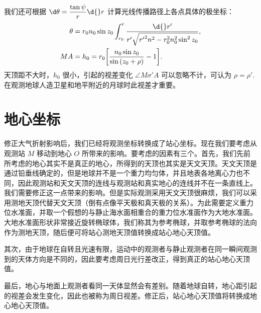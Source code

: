\documentclass[UTF8, 12pt, a4paper, oneside, onecolumn, fontset=none]{ctexart}
\begin{document}
我们还可根据 $\d\theta=\dfrac{\tan{\psi}}{r}\d{}r$ 计算光线传播路径上各点具体的极坐标：
\begin{align}
\theta&=r_{0}n_{0}\sin{z_{0}}\int_{r_{0}}^{r}\frac{\d{}r'}{r'\sqrt{{r'}^{2}n^{2}-r^{2}_{0}n_{0}^{2}\sin^{2}{z_{0}}}},\\
MA&=h_{0}=r_{0}\mleft[\frac{n_{0}\sin{z_{0}}}{\sin{\mleft(z_{0}+\rho\mright)}}-1\mright].
\end{align}
天顶距不大时，$h_{0}$ 很小，引起的视差变化 $\angle{M\sigma'A}$ 可以忽略不计，可认为 $\rho=\rho'$. 在观测地球人造卫星和地平附近的月球时此视差才重要。

\newpage
\section{地心坐标}
修正大气折射影响后，我们已经将观测坐标转换成了站心坐标。现在我们要考虑从观测站 $M$ 移动到地心 $O$ 所带来的影响。要考虑的因素有三个。首先，我们先前所考虑的地心其实不是真正的地心，所得到的天顶也其实是天文天顶。天文天顶是通过铅垂线确定的，但是地球并不是一个重力均匀体，并且地表各地离心力也不同，因此观测站和天文天顶的连线与观测站和真实地心的连线并不在一条直线上。我们需要修正这一点带来的影响。但是实际观测采用天文天顶很麻烦，我们可以采用测地天顶代替天文天顶（倒有点像平天极和真天极的关系）。为此需要定义重力位水准面，并取一个假想的与静止海水面相重合的重力位水准面作为大地水准面。大地水准面形状非常接近旋转椭球体，我们称其为参考椭球，并取参考椭球的法向作为测地天顶，随后便可将站心测地天顶值转换成站心地心天顶值。

其次，由于地球在自转且光速有限，运动中的观测者与静止观测者在同一瞬间观测到的天体方向是不同的，因此要考虑周日光行差改正，得到真正的站心地心天顶值。

最后，地心与地面上观测者看同一天体显然会有差别。随着地球自转，地心距引起的视差会发生变化，因此也被称为周日视差。修正后，站心地心天顶值将转换成地心地心天顶值。
\end{document}
